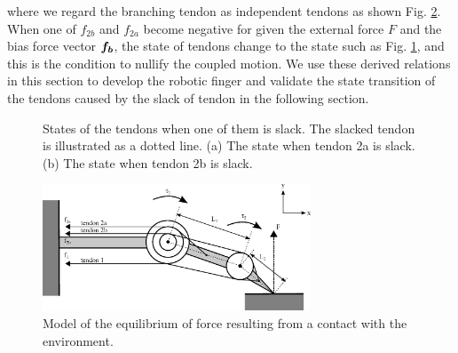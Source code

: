 \documentclass{llncs}
\def\vect#1{\mbox{\boldmath$#1$}}
\begin{document}
where we regard the branching tendon as independent tendons as shown Fig. \ref{external_force}.
When one of $f_{2b}$ and $f_{2a}$ become negative for given the external force $F$ and the bias force vector $\vect{f_{b}}$, the state of tendons change to the state such as Fig. \ref{slacked_tendons}, and this is the condition to nullify the coupled motion.
We use these derived relations in this section to develop the robotic finger and validate the state transition of the tendons caused by the slack of tendon in the following section.

\begin{figure}[t]
	\centering
	\caption{States of the tendons when one of them is slack. The slacked tendon is illustrated as a dotted line. (a) The state when tendon 2a is slack. (b)  The state when tendon 2b is slack.}
	\label{slacked_tendons}
\end{figure}

\begin{figure}[t]
	\centering
	\includegraphics[width=80mm]{fig/force.eps}
	\caption{Model of the equilibrium of force resulting from a contact with the environment.}
	\label{external_force}
\end{figure}
\end{document}
